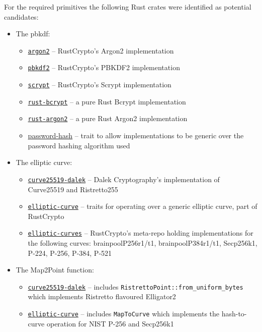 For the required primitives the following Rust crates were identified as potential candidates:
\begin{itemize}
  \item{
    The \gls{pbkdf}:
    \begin{itemize}
      \item{\href{https://github.com/RustCrypto/password-hashes/tree/master/argon2}{\texttt{argon2}} -- RustCrypto's Argon2 implementation}
      \item{\href{https://github.com/RustCrypto/password-hashes/tree/master/pbkdf2}{\texttt{pbkdf2}} -- RustCrypto's PBKDF2 implementation}
      \item{\href{https://github.com/RustCrypto/password-hashes/tree/master/scrypt}{\texttt{scrypt}} -- RustCrypto's Scrypt implementation}
      \item{\href{https://github.com/Keats/rust-bcrypt}{\texttt{rust-bcrypt}} -- a pure Rust Bcrypt implementation}
      \item{\href{https://github.com/sru-systems/rust-argon2}{\texttt{rust-argon2}} -- a pure Rust Argon2 implementation}
      \item{\href{https://github.com/RustCrypto/traits/tree/master/password-hash}{password-hash} -- trait to allow implementations to be generic over the password hashing algorithm used}
    \end{itemize}
  }

  \item{
    The elliptic curve:
    \begin{itemize}
      \item{\href{https://github.com/dalek-cryptography/curve25519-dalek}{\texttt{curve25519-dalek}} -- Dalek Cryptography's implementation of Curve25519 and Ristretto255 \cite{ristretto255}}
      \item{\href{https://github.com/RustCrypto/traits/tree/master/elliptic-curve}{\texttt{elliptic-curve}} -- traits for operating over a generic elliptic curve, part of RustCrypto}
      \item{\href{https://github.com/RustCrypto/elliptic-curves}{\texttt{elliptic-curves}} -- RustCrypto's meta-repo holding implementations for the following curves: brainpoolP256r1/t1, brainpoolP384r1/t1, Secp256k1, P-224, P-256, P-384, P-521}
    \end{itemize}
  }

  \item{
    The \textsf{Map2Point} function:
    \begin{itemize}
      \item{\href{https://github.com/dalek-cryptography/curve25519-dalek}{\texttt{curve25519-dalek}} -- includes \verb|RistrettoPoint::from_uniform_bytes| which implements Ristretto flavoured Elligator2}
      \item{\href{https://github.com/RustCrypto/traits/tree/master/elliptic-curve}{\texttt{elliptic-curve}} -- includes \texttt{MapToCurve} which implements the hash-to-curve operation for NIST P-256 and Secp256k1}
    \end{itemize}
  }


\end{itemize}
